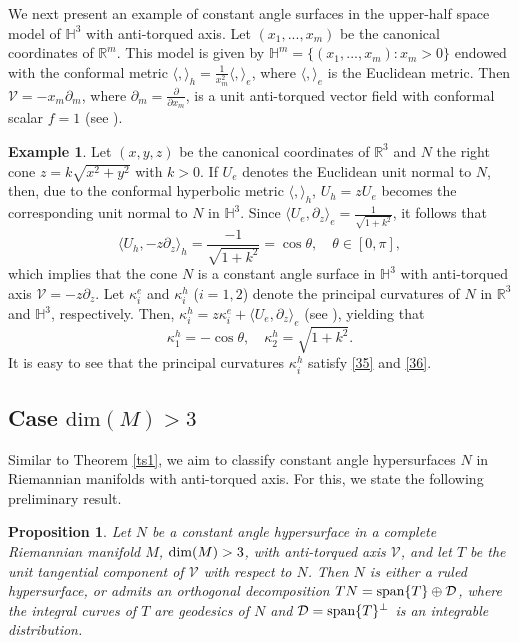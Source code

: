 \documentclass[12pt]{amsart}
\def\r{\mathbb R}
\def\h{\mathbb H}
\def\v{\mathcal V}
\newtheorem{proposition}[theorem]{Proposition}
\theoremstyle{definition}
\newtheorem{example}[theorem]{Example}
\begin{document}
We next present an example of constant angle surfaces in the upper-half space model of $\h^3$ with anti-torqued axis. Let $(x_1,...,x_m)$ be the canonical coordinates of $\r^m$. This model is given by $\h^m=\{(x_1,...,x_m):x_m>0\}$ endowed with the conformal metric $\langle,\rangle_h=\frac{1}{x_m^2}\langle , \rangle_e$, where $\langle , \rangle_e$ is the Euclidean metric. Then $\v=-x_m\partial_m$, where $\partial_m=\frac{\partial}{\partial x_m}$, is a unit anti-torqued vector field with conformal scalar $f=1$ (see \cite{amc}).

\begin{example}\label{hsur}
Let $(x,y,z)$ be the canonical coordinates of $\r^3$ and $N$ the right cone $z=k\sqrt{x^2+y^2}$ with $k>0$. If $U_e$ denotes the Euclidean unit normal to $N$, then, due to the conformal hyperbolic metric $\langle , \rangle_h$, $U_h=zU_e$ becomes the corresponding unit normal to $N$ in $\h^3$. Since $\langle U_e,\partial_z\rangle_e =\frac{1}{\sqrt{1+k^2}}$, it follows that 
$$\langle U_h,-z\partial_z \rangle_h=\frac{-1}{\sqrt{1+k^2}}=\cos\theta, \quad \theta \in [0,\pi],
$$ 
which implies that the cone $N$ is a constant angle surface in $\h^3$ with anti-torqued axis $\v=-z\partial_z$. Let $\kappa_i^e$ and $\kappa_i^h$ ($i=1,2$) denote the principal curvatures of $N$ in $\r^3$ and $\h^3$, respectively. Then, $\kappa_i^h=z\kappa_i^e+\langle U_e,\partial_z\rangle_e$ (see \cite{gss}), yielding that
$$
\kappa_1^h=-\cos\theta, \quad \kappa_2^h=\sqrt{1+k^2}.
$$
It is easy to see that the principal curvatures $\kappa_i^h$ satisfy \eqref{35} and \eqref{36}.
\end{example}

\subsection{Case $\mbox{dim}(M)>3$} Similar to Theorem \ref{ts1}, we aim to classify constant angle hypersurfaces $N$ in  Riemannian manifolds with anti-torqued axis. For this, we state the following preliminary result.

\begin{proposition} \label{phs1}
Let $N$ be a constant angle hypersurface in a complete Riemannian manifold $M$, $\textnormal{dim}(M)>3$, with anti-torqued axis $\v$, and let $T$ be the unit tangential component of $\v$ with respect to $N$. Then $N$ is either a ruled hypersurface, or admits an orthogonal decomposition $TN=\textnormal{span}\{T\}\oplus \mathcal{D}$, where the integral curves of $T$ are geodesics of $N$ and $ \mathcal{D} =\textnormal{span}\{T\}^\perp$ is an integrable distribution.
\end{proposition}
\end{document}
